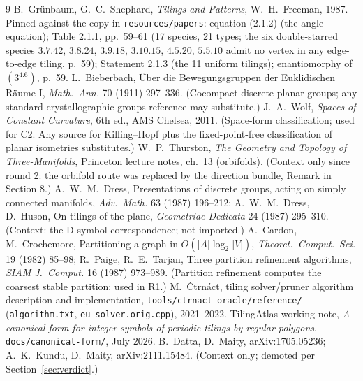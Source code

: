 \documentclass[11pt]{article}
\theoremstyle{definition}
\begin{document}
\begin{thebibliography}{9}
 B.~Gr\"unbaum, G.~C.~Shephard, \emph{Tilings and Patterns}, W.~H.~Freeman,
1987. Pinned against the copy in \texttt{resources/papers}: equation (2.1.2) (the angle
equation); Table 2.1.1, pp.~59--61 (17 species, 21 types; the six double-starred species
$3.7.42$, $3.8.24$, $3.9.18$, $3.10.15$, $4.5.20$, $5.5.10$ admit no vertex in any
edge-to-edge tiling, p.~59); Statement 2.1.3 (the 11 uniform tilings); enantiomorphy of
$(3^4.6)$, p.~59.
 L.~Bieberbach, \"Uber die Bewegungsgruppen der Euklidischen
R\"aume I, \emph{Math.\ Ann.} 70 (1911) 297--336. (Cocompact discrete planar groups; any
standard crystallographic-groups reference may substitute.)
 J.~A.~Wolf, \emph{Spaces of Constant Curvature}, 6th ed., AMS Chelsea,
2011. (Space-form classification; used for C2. Any source for Killing--Hopf plus the
fixed-point-free classification of planar isometries substitutes.)
 W.~P.~Thurston, \emph{The Geometry and Topology of Three-Manifolds},
Princeton lecture notes, ch.~13 (orbifolds). (Context only since round 2: the orbifold
route was replaced by the direction bundle, Remark in Section 8.)
 A.~W.~M.~Dress, Presentations of discrete groups, acting on simply
connected manifolds, \emph{Adv.\ Math.} 63 (1987) 196--212; A.~W.~M.~Dress, D.~Huson,
On tilings of the plane, \emph{Geometriae Dedicata} 24 (1987) 295--310. (Context: the
D-symbol correspondence; not imported.)
 A.~Cardon, M.~Crochemore, Partitioning a graph in $O(|A|\log_2|V|)$,
\emph{Theoret.\ Comput.\ Sci.} 19 (1982) 85--98; R.~Paige, R.~E.~Tarjan, Three partition
refinement algorithms, \emph{SIAM J.\ Comput.} 16 (1987) 973--989. (Partition
refinement computes the coarsest stable partition; used in R1.)
 M.~\v{C}trn\'act, tiling solver/pruner algorithm description and
implementation, \texttt{tools/ctrnact-oracle/reference/} (\texttt{algorithm.txt},
\texttt{eu\_solver.orig.cpp}), 2021--2022.
 TilingAtlas working note, \emph{A canonical form for integer symbols of
periodic tilings by regular polygons}, \texttt{docs/canonical-form/}, July 2026.
 B.~Datta, D.~Maity, arXiv:1705.05236; A.~K.~Kundu, D.~Maity,
arXiv:2111.15484. (Context only; demoted per Section~\ref{sec:verdict}.)
\end{thebibliography}
\end{document}
